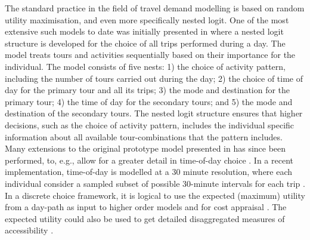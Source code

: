 


The standard practice in the field of travel demand modelling is based on random utility maximisation, and even more specifically nested logit. One of the most extensive such models to date was initially presented in \citet{bowman2001} where a nested logit structure is developed for the choice of all trips performed during a day. The model treats tours and activities sequentially based on their importance for the individual. The model consists of five nests: 1) the choice of activity pattern, including the number of tours carried out during the day; 2) the choice of time of day for the primary tour and all its trips; 3) the mode and destination for the primary tour; 4) the time of day for the secondary tours; and 5) the mode and destination of the secondary tours. The nested logit structure ensures that higher decisions, such as the choice of activity pattern, includes the individual specific information about all available tour-combinations that the pattern includes. Many extensions to the original prototype model presented in \citet{bowman2001} has since been performed, to, e.g., allow for a greater detail in time-of-day choice \citep{Vovsha04}. In a recent implementation, time-of-day is modelled at a 30 minute resolution, where each individual consider a sampled subset of possible 30-minute intervals for each trip \citep{bradley2010sacsim}. In a discrete choice framework, it is logical to use the expected (maximum) utility from a day-path as input to higher order models and for cost appraisal \citep{Geurs10}. The expected utility could also be used to get detailed disaggregated measures of accessibility \citep{dong2006moving}.


